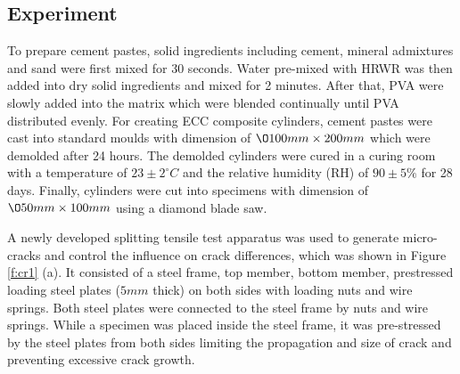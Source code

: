 \documentclass[11pt]{article}
\begin{document}
	\subsection{Experiment}
	\label{experi}
	
	To prepare cement pastes, solid ingredients including cement, mineral admixtures and sand were first mixed for 30 seconds. Water pre-mixed with HRWR was then added into dry solid ingredients and mixed for 2 minutes. After that, PVA were slowly added into the matrix which were blended continually until PVA distributed evenly. For creating ECC composite cylinders, cement pastes were cast into standard moulds with dimension of $\O 100mm \times 200mm$ which were demolded after 24 hours. The demolded cylinders were cured in a curing room with a temperature of $23 \pm 2^\circ C$ and the relative humidity (RH) of $90 \pm 5\%$ for 28 days. Finally, cylinders were cut into specimens with dimension of $\O 50mm \times 100mm$ using a diamond blade saw. 
	
	A newly developed splitting tensile test apparatus was used to generate micro-cracks and control the influence on crack differences, which was shown in Figure \ref{f:cr1} (a). It consisted of a steel frame, top member, bottom member, prestressed loading steel plates ($5 mm$ thick) on both sides with loading nuts and wire springs. Both steel plates were connected to the steel frame by nuts and wire springs. While a specimen was placed inside the steel frame, it was pre-stressed by the steel plates from both sides limiting the propagation and size of crack and preventing excessive crack growth. 
	
\end{document}
